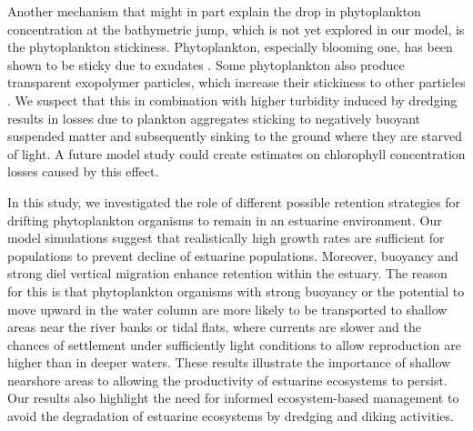 \documentclass[npg, manuscript]{copernicus}
\begin{document}
Another mechanism that might in part explain the drop in phytoplankton concentration at the bathymetric jump, which is not yet explored in our model, is the phytoplankton stickiness.
Phytoplankton, especially blooming one, has been shown to be sticky due to exudates \citep{Kiørboe1993,VanderLee2000,Dutz2005}. 
Some phytoplankton also produce transparent exopolymer particles, which increase their stickiness to other particles \citep{Windler,DeBrouwer2005}.
We suspect that this in combination with  higher turbidity induced by dredging results in losses due to plankton aggregates sticking to negatively buoyant suspended matter and subsequently sinking to the ground where they are starved of light.
A future model study could create estimates on chlorophyll concentration losses caused by this effect.


\conclusions  %
In this study, we investigated the role of different possible retention strategies for drifting phytoplankton organisms to remain in an estuarine environment.
Our model simulations suggest that realistically high growth rates are sufficient for populations to prevent decline of estuarine populations.
Moreover, buoyancy and strong diel vertical migration enhance retention within the estuary.
The reason for this is that phytoplankton organisms with strong buoyancy or the potential to move upward in the water column are more likely to be transported to shallow areas near the river banks or tidal flats, where currents are slower and the chances of settlement under sufficiently light conditions to allow reproduction are higher than in deeper waters.
These results illustrate the importance of shallow nearshore areas to allowing the productivity of estuarine ecosystems to persist.
Our results also highlight the need for informed ecosystem-based management to avoid the degradation of estuarine ecosystems by dredging and diking activities.




\end{document}
